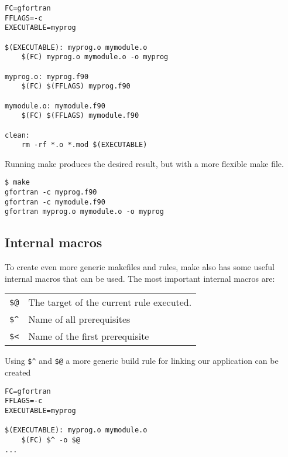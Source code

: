 \mmode

\begin{lstlisting}
FC=gfortran
FFLAGS=-c
EXECUTABLE=myprog

$(EXECUTABLE): myprog.o mymodule.o
	$(FC) myprog.o mymodule.o -o myprog

myprog.o: myprog.f90 
	$(FC) $(FFLAGS) myprog.f90

mymodule.o: mymodule.f90
	$(FC) $(FFLAGS) mymodule.f90
	
clean:
	rm -rf *.o *.mod $(EXECUTABLE)
\end{lstlisting}

Running make produces the desired result, but with a more flexible make file.

\cmdmode

\begin{lstlisting}
$ make
gfortran -c myprog.f90
gfortran -c mymodule.f90
gfortran myprog.o mymodule.o -o myprog
\end{lstlisting}

\subsection{Internal macros}

To create even more generic makefiles and rules, make also has some useful internal macros that can be used. The most important internal macros are:

\begin{center}
\begin{tabular}{ ll }
  \verb|$@| & The target of the current rule executed. \\
  \verb|$^| & Name of all prerequisites \\
  \verb|$<| & Name of the first prerequisite \\
\end{tabular}
\end{center}

\mmode

Using \verb|$^| and \verb|$@| a more generic build rule for linking our application can be created

\begin{lstlisting}
FC=gfortran
FFLAGS=-c
EXECUTABLE=myprog

$(EXECUTABLE): myprog.o mymodule.o
	$(FC) $^ -o $@
...
\end{lstlisting}

